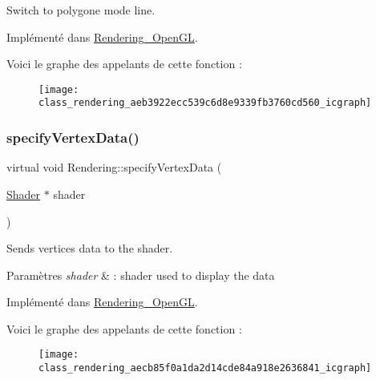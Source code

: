 Switch to polygone mode line. 



Implémenté dans \hyperlink{class_rendering___open_g_l_a7742b4b96b3e06a021f143d17fd432df}{Rendering\+\_\+\+Open\+GL}.

Voici le graphe des appelants de cette fonction \+:\nopagebreak
\begin{figure}[H]
\begin{center}
\leavevmode
\texttt{[image: class\_rendering\_aeb3922ecc539c6d8e9339fb3760cd560\_icgraph]}
\end{center}
\end{figure}
\mbox{\label{class_rendering_aecb85f0a1da2d14cde84a918e2636841}} 
\subsubsection{\texorpdfstring{specify\+Vertex\+Data()}{specifyVertexData()}}
{\footnotesize\ttfamily virtual void Rendering\+::specify\+Vertex\+Data (\begin{DoxyParamCaption}\item[{\hyperlink{class_shader}{Shader} $\ast$}]{shader }\end{DoxyParamCaption})\hspace{0.3cm}{\ttfamily [pure virtual]}}



Sends vertices data to the shader. 


\begin{DoxyParams}{Paramètres}
{\em shader} & \+: shader used to display the data \\
\hline
\end{DoxyParams}


Implémenté dans \hyperlink{class_rendering___open_g_l_a8ad1a3e698d694782f4174d94b745cd5}{Rendering\+\_\+\+Open\+GL}.

Voici le graphe des appelants de cette fonction \+:\nopagebreak
\begin{figure}[H]
\begin{center}
\leavevmode
\texttt{[image: class\_rendering\_aecb85f0a1da2d14cde84a918e2636841\_icgraph]}
\end{center}
\end{figure}
\mbox{\label{class_rendering_a09a77bbedf75aff7535c419b6f8e4915}} 
